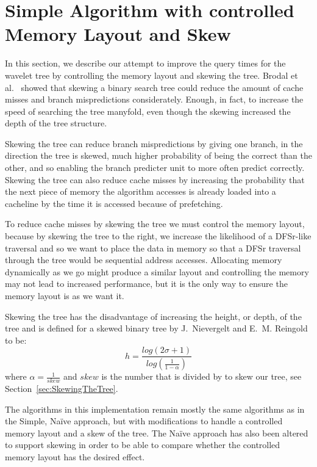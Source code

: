 \section{Simple Algorithm with controlled Memory Layout and Skew}
\label{sec:memorylayout}
In this section, we describe our attempt to improve the query times for the wavelet tree by controlling the memory layout and skewing the tree.
Brodal et al.~ showed that skewing a binary search tree could reduce the amount of cache misses and branch mispredictions considerately. Enough, in fact, to increase the speed of searching the tree manyfold, even though the skewing increased the depth of the tree structure.

Skewing the tree can reduce branch mispredictions by giving one branch, in the direction the tree is skewed, much higher probability of being the correct than the other, and so enabling the branch predicter unit to more often predict correctly. 
Skewing the tree can also reduce cache misses by increasing the probability that the next piece of memory the algorithm accesses is already loaded into a cacheline by the time it is accessed because of prefetching.

To reduce cache misses by skewing the tree we must control the memory layout, because by skewing the tree to the right, we increase the likelihood of a DFSr-like traversal and so we want to place the data in memory so that a DFSr traversal through the tree would be sequential address accesses.
Allocating memory dynamically as we go might produce a similar layout and controlling the memory may not lead to increased performance, but it is the only way to ensure the memory layout is as we want it.

Skewing the tree has the disadvantage of increasing the height, or depth, of the tree 
and is defined for a skewed binary tree by J.~Nievergelt and E.~M. Reingold~ to be:
\[ h = \frac{log(2\sigma+1)}{ log(\frac{1}{1-\alpha})}\]
where $\alpha = \frac{1}{skew}$ and $skew$ is the number that is divided by to skew our tree, see Section~\ref{sec:SkewingTheTree}.

The algorithms in this implementation remain mostly the same algorithms as in the Simple, Naïve approach, but with modifications to handle a controlled memory layout and a skew of the tree.
The Naïve approach has also been altered to support skewing in order to be able to compare whether the controlled memory layout has the desired effect.


